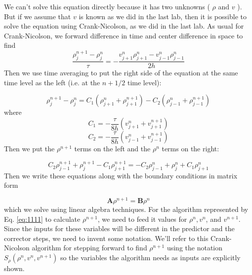 We can\rq t solve this equation directly because it has two unknowns ( $\rho$ and $v$ ). But if we assume that $v$ is known as we did in the last lab, then it is possible to solve the equation using Crank-Nicolson, as we did in the last lab. As usual for Crank-Nicolson, we forward difference in time and center difference in space to find
\begin{equation}\label{eq:1106}
\frac{\rho_{j}^{n+1}-\rho_{j}^{n}}{\tau}=-\frac{v_{j+1}^{n} \rho_{j+1}^{n}-v_{j-1}^{n} \rho_{j-1}^{n}}{2 h}
\end{equation}
Then we use time averaging to put the right side of the equation at the same time level as the left (i.e. at the $n+1 / 2$ time level):

\begin{equation}\label{eq:1107}
\rho_{j}^{n+1}-\rho_{j}^{n}=C_{1}\left(\rho_{j+1}^{n}+\rho_{j+1}^{n+1}\right)-C_{2}\left(\rho_{j-1}^{n}+\rho_{j-1}^{n+1}\right)
\end{equation}
where
\begin{equation}\label{eq:1108}
C_{1}=-\frac{\tau}{8 h}\left(v_{j+1}^{n}+v_{j+1}^{n+1}\right)
\end{equation}
\begin{equation}\label{eq:1109}
C_{2}=-\frac{\tau}{8 h}\left(v_{j-1}^{n}+v_{j-1}^{n+1}\right)
\end{equation}
 Then we put the  $\rho^{n+1}$  terms on the left and the $\rho^{n}$ terms on the right: 

\begin{equation}\label{eq:1110}
C_{2} \rho_{j-1}^{n+1}+\rho_{j}^{n+1}-C_{1} \rho_{j+1}^{n+1}=-C_{2} \rho_{j-1}^{n}+\rho_{j}^{n}+C_{1} \rho_{j+1}^{n}
\end{equation}
Then we write these equations along with the boundary conditions in matrix form

\begin{equation}\label{eq:1111}
\mathbf{A} \rho^{n+1}=\mathbf{B} \rho^{n}
\end{equation}
which we solve using linear algebra techniques. For the algorithm represented by Eq. \ref{eq:1111} to calculate $\rho^{n+1}$, we need to feed it values for $\rho^{n}, v^{n}$, and $v^{n+1}$. Since the inputs for these variables will be different in the predictor and the corrector steps, we need to invent some notation. We\rq ll refer to this Crank-Nicolson algorithm for stepping forward to find $\rho^{n+1}$ using the notation $S_{\rho}\left(\rho^{n}, v^{n}, v^{n+1}\right)$ so the variables the algorithm needs as inputs are explicitly shown.

